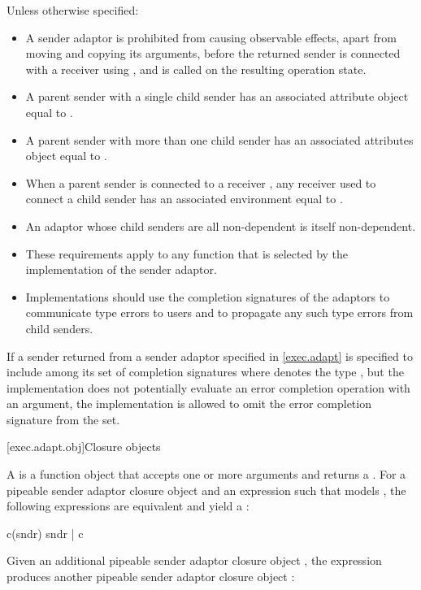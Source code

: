\pnum
Unless otherwise specified:
\begin{itemize}
\item
A sender adaptor is prohibited from causing observable effects,
apart from moving and copying its arguments,
before the returned sender is connected with a receiver using ,
and  is called on the resulting operation state.
\item
A parent sender with a single child sender  has
an associated attribute object equal to
.
\item
A parent sender with more than one child sender has
an associated attributes object equal to .
\item
When a parent sender is connected to a receiver ,
any receiver used to connect a child sender has
an associated environment equal to .
\item
An adaptor whose child senders are all non-dependent
is itself non-dependent.
\item
These requirements apply to any function
that is selected by the implementation of the sender adaptor.
\item
 \recommended
Implementations should use
the completion signatures of the adaptors
to communicate type errors to users and
to propagate any such type errors from child senders.
\end{itemize}

\pnum
If a sender returned from a sender adaptor specified in \ref{exec.adapt}
is specified to include 
among its set of completion signatures
where  denotes the type ,
but the implementation does not potentially evaluate
an error completion operation with an  argument,
the implementation is allowed to omit
the  error completion signature from the set.

[exec.adapt.obj]{Closure objects}

\pnum
A  is a function object
that accepts one or more  arguments and returns a .
For a pipeable sender adaptor closure object  and
an expression 
such that  models ,
the following expressions are equivalent and yield a :
\begin{codeblock}
c(sndr)
sndr | c
\end{codeblock}
Given an additional pipeable sender adaptor closure object ,
the expression  produces
another pipeable sender adaptor closure object :

